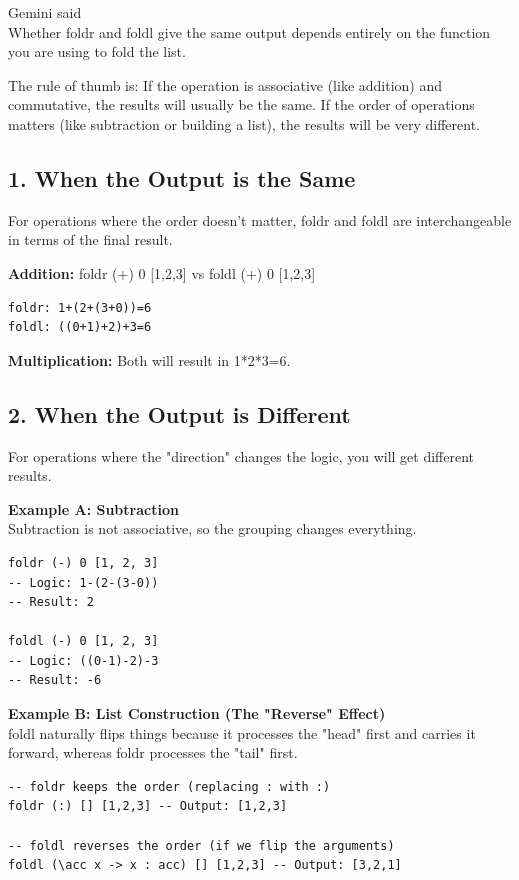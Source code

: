 \documentclass[12pt]{article}
\begin{document}
Gemini said \\
Whether foldr and foldl give the same output depends entirely on the function you are using to fold the list.

The rule of thumb is: If the operation is associative (like addition) and commutative, the results will usually be the same. If the order of operations matters (like subtraction or building a list), the results will be very different.

\subsection{1. When the Output is the Same}
For operations where the order doesn't matter, foldr and foldl are interchangeable in terms of the final result.

\textbf{Addition:} foldr (+) 0 [1,2,3] vs foldl (+) 0 [1,2,3]

\begin{verbatim}
foldr: 1+(2+(3+0))=6
foldl: ((0+1)+2)+3=6
\end{verbatim}

\textbf{Multiplication:} Both will result in 1*2*3=6.

\subsection{2. When the Output is Different}
For operations where the "direction" changes the logic, you will get different results.

\textbf{Example A: Subtraction} \\
Subtraction is not associative, so the grouping changes everything.

\begin{verbatim}
foldr (-) 0 [1, 2, 3]
-- Logic: 1-(2-(3-0))
-- Result: 2

foldl (-) 0 [1, 2, 3]
-- Logic: ((0-1)-2)-3
-- Result: -6
\end{verbatim}

\textbf{Example B: List Construction (The "Reverse" Effect)} \\
foldl naturally flips things because it processes the "head" first and carries it forward, whereas foldr processes the "tail" first.

\begin{verbatim}
-- foldr keeps the order (replacing : with :)
foldr (:) [] [1,2,3] -- Output: [1,2,3]

-- foldl reverses the order (if we flip the arguments)
foldl (\acc x -> x : acc) [] [1,2,3] -- Output: [3,2,1]
\end{verbatim}
\end{document}
